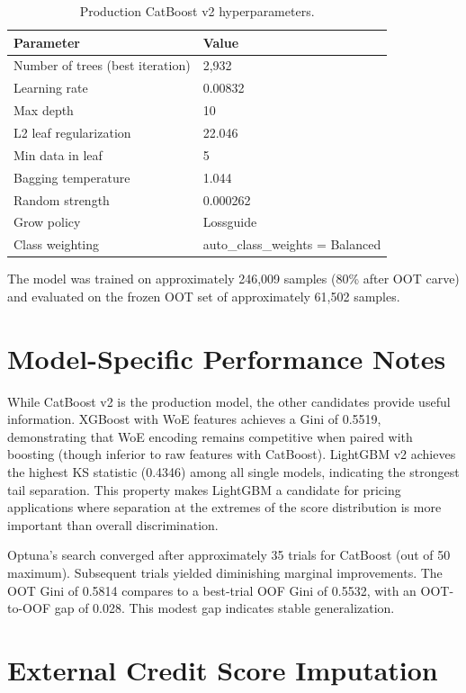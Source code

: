 \documentclass[11pt, a4paper]{article}
\begin{document}
\begin{table}[H]
  \centering
  \caption{Production CatBoost v2 hyperparameters.}
  \begin{tabular}{ll}
    \toprule
    Parameter & Value \\
    \midrule
    Number of trees (best iteration) & 2{,}932 \\
    Learning rate & 0.00832 \\
    Max depth & 10 \\
    L2 leaf regularization & 22.046 \\
    Min data in leaf & 5 \\
    Bagging temperature & 1.044 \\
    Random strength & 0.000262 \\
    Grow policy & Lossguide \\
    Class weighting & auto\_class\_weights = Balanced \\
    \bottomrule
  \end{tabular}
\end{table}

The model was trained on approximately 246,009 samples (80\% after OOT carve) and evaluated on the frozen OOT set of approximately 61,502 samples.

\section{Model-Specific Performance Notes}
\label{app:model_notes}

While CatBoost v2 is the production model, the other candidates provide useful information. XGBoost with WoE features achieves a Gini of 0.5519, demonstrating that WoE encoding remains competitive when paired with boosting (though inferior to raw features with CatBoost). LightGBM v2 achieves the highest KS statistic (0.4346) among all single models, indicating the strongest tail separation. This property makes LightGBM a candidate for pricing applications where separation at the extremes of the score distribution is more important than overall discrimination.

Optuna's search converged after approximately 35 trials for CatBoost (out of 50 maximum). Subsequent trials yielded diminishing marginal improvements. The OOT Gini of 0.5814 compares to a best-trial OOF Gini of 0.5532, with an OOT-to-OOF gap of 0.028. This modest gap indicates stable generalization.

\section{External Credit Score Imputation}
\label{app:imputation}
\end{document}

